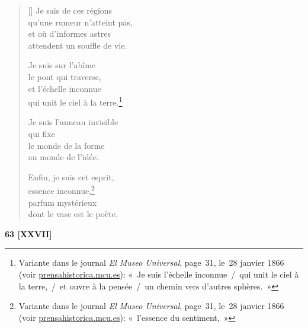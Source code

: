\documentclass[a4paper,12pt]{book}
\begin{document}
\begin{verse}[\versewidth]
  Je sais de ces régions \\
  qu'une rumeur n'atteint pas, \\
  et où d'informes astres \\
  attendent un souffle de vie.

  Je suis sur l'abîme \\
  le pont qui traverse, \\
  et l'échelle inconnue \\
  qui unit le ciel à la terre.\footnote{Variante dans le journal
  \emph{El Museo Universal}, page~31, le~28 janvier 1866 (voir
  \url{prensahistorica.mcu.es}): «~Je suis l'échelle inconnue~/~qui unit
  le ciel à la terre,~/~et ouvre à la pensée~/~un chemin vers d'autres
  sphères.~»}

  Je suis l'anneau invisible \\
  qui fixe \\
  le monde de la forme \\
  au monde de l'idée.

  Enfin, je suis cet esprit, \\
  essence inconnue,\footnote{Variante dans le journal
  \emph{El Museo Universal}, page~31, le~28 janvier 1866 (voir
  \url{prensahistorica.mcu.es}): «~l'essence du sentiment,~»} \\
  parfum mystérieux \\
  dont le vase est le poète.
\end{verse}

\bigskip

\begin{center}
  \textbf{63 [XXVII]}
\end{center}

\settowidth{\versewidth}{Éveillée, tu regardes et, en regardant, tes yeux}
\end{document}
